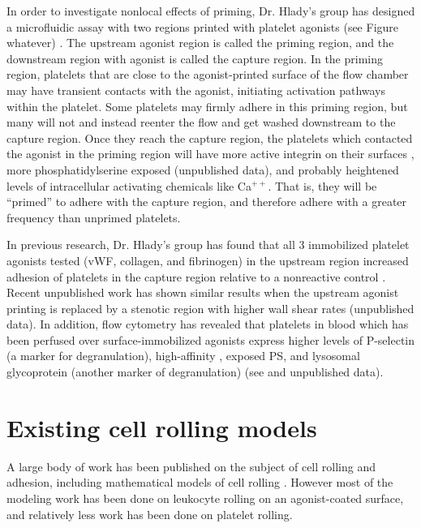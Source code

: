 In order to investigate nonlocal effects of priming, Dr. Hlady's group
has designed a microfluidic assay with two regions printed with
platelet agonists (see Figure whatever) \cite{Corum2012}. The upstream
agonist region is called the priming region, and the downstream region
with agonist is called the capture region. In the priming region,
platelets that are close to the agonist-printed surface of the flow
chamber may have transient contacts with the agonist, initiating
activation pathways within the platelet. Some platelets may firmly
adhere in this priming region, but many will not and instead reenter
the flow and get washed downstream to the capture region. Once they
reach the capture region, the platelets which contacted the agonist in
the priming region will have more active integrin on their surfaces
\cite{Corum2012}, more phosphatidylserine exposed (unpublished data),
and probably heightened levels of intracellular activating chemicals
like Ca$^{++}$. That is, they will be ``primed'' to adhere with the
capture region, and therefore adhere with a greater frequency than
unprimed platelets.

In previous research, Dr. Hlady's group has found that all 3
immobilized platelet agonists tested (vWF, collagen, and fibrinogen)
in the upstream region increased adhesion of platelets in the capture
region relative to a nonreactive control
\cite{Corum2012,Eichinger2016}. Recent unpublished work has shown
similar results when the upstream agonist printing is replaced by a
stenotic region with higher wall shear rates (unpublished data). In
addition, flow cytometry has revealed that platelets in blood which
has been perfused over surface-immobilized agonists express higher
levels of P-selectin (a marker for degranulation), high-affinity
, exposed PS, and lysosomal glycoprotein (another
marker of degranulation) (see \cite{Corum2012,Eichinger2016} and
unpublished data).

\section{Existing cell rolling models}
\label{sec:exist-cell-roll}

A large body of work has been published on the subject of cell rolling
and adhesion, including mathematical models of cell rolling
\cite{Pospieszalska2009,Sundd2011}. However most of the modeling work
has been done on leukocyte rolling on an agonist-coated surface, and
relatively less work has been done on platelet rolling.

